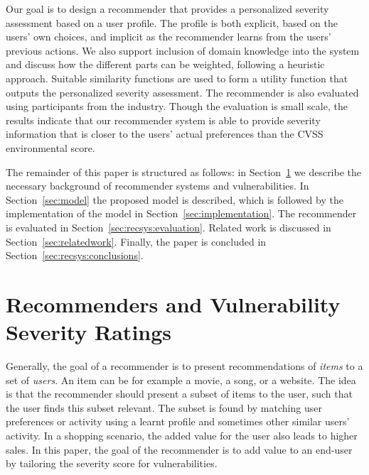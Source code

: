 {Our goal is to design a recommender that provides a personalized severity assessment based on a user profile.
The profile is both explicit, based on the users' own choices, and implicit as the recommender learns from the users' previous actions.
We also support inclusion of domain knowledge into the system and discuss how the different parts can be weighted, following a heuristic approach. Suitable similarity functions are used to form a utility function that outputs the personalized severity assessment. The recommender is also evaluated using participants from the industry. Though the evaluation is small scale, the results indicate that our recommender system is able to provide severity information that is closer to the users' actual preferences than the CVSS environmental score.

The remainder of this paper is structured as follows: in Section~\ref{sec:recsys:background} we describe the necessary background of recommender systems and vulnerabilities.
In Section~\ref{sec:model} the proposed model is described, which is followed by the implementation of the model in Section~\ref{sec:implementation}.
The recommender is evaluated in Section~\ref{sec:recsys:evaluation}.
Related work is discussed in Section~\ref{sec:relatedwork}.
Finally, the paper is concluded in Section~\ref{sec:recsys:conclusions}.


\section{Recommenders and Vulnerability Severity Ratings} \label{sec:recsys:background}

Generally, the goal of a recommender is to present recommendations of \emph{items} to a set of \emph{users}. An item can be for example a movie, a song, or a website. 
The idea is that the recommender should present a subset of items to the user, such that the user finds this subset relevant. The subset is found by matching user preferences or activity  using a learnt profile and sometimes other similar users' activity. In a shopping scenario, the added value for the user also leads to higher sales.
In this paper, the goal of the recommender is to add value to an end-user by tailoring the severity score for vulnerabilities.

}
